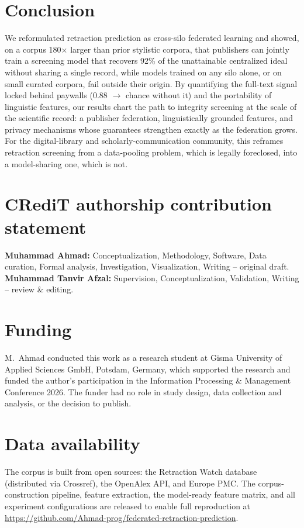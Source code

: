 \documentclass[review,12pt]{elsarticle}
\begin{document}
\section{Conclusion}
\label{sec:conclusion}
We reformulated retraction prediction as cross-silo federated learning and
showed, on a corpus 180$\times$ larger than prior stylistic corpora, that
publishers can jointly train a screening model that recovers 92\% of the
unattainable
centralized ideal without sharing a single record, while models trained on
any silo alone, or on small curated corpora, fail outside their origin. By
quantifying the full-text signal locked behind paywalls (0.88 $\rightarrow$
chance without it) and the portability of linguistic features, our results
chart the path to integrity screening at the scale of the scientific record:
a publisher federation, linguistically grounded features, and privacy
mechanisms whose guarantees strengthen exactly as the federation grows. For
the digital-library and scholarly-communication community, this reframes
retraction screening from a data-pooling problem, which is legally
foreclosed, into a model-sharing one, which is not.

\section*{CRediT authorship contribution statement}
\textbf{Muhammad Ahmad:} Conceptualization, Methodology, Software, Data
curation, Formal analysis, Investigation, Visualization, Writing -- original
draft. \textbf{Muhammad Tanvir Afzal:} Supervision, Conceptualization,
Validation, Writing -- review \& editing.

\section*{Funding}
M.\ Ahmad conducted this work as a research student at Gisma University of
Applied Sciences GmbH, Potsdam, Germany, which supported the research and
funded the author's participation in the Information Processing \& Management
Conference 2026. The funder had no role in study design, data collection and
analysis, or the decision to publish.

\section*{Data availability}
The corpus is built from open sources: the Retraction Watch database
(distributed via Crossref), the OpenAlex API, and Europe PMC. The
corpus-construction pipeline, feature extraction, the model-ready feature
matrix, and all experiment configurations are released to enable full
reproduction at
\url{https://github.com/Ahmad-prog/federated-retraction-prediction}.
\end{document}
